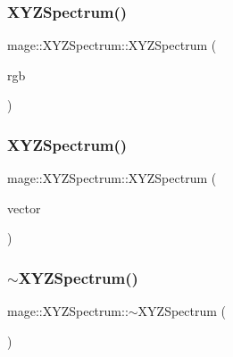 \hypertarget{structmage_1_1_x_y_z_spectrum_a91cf5d611fbad0e47b6718a04b9a505d}{}\label{structmage_1_1_x_y_z_spectrum_a91cf5d611fbad0e47b6718a04b9a505d} 
\subsubsection{\texorpdfstring{X\+Y\+Z\+Spectrum()}{XYZSpectrum()}\hspace{0.1cm}{\footnotesize\ttfamily [4/5]}}
{\footnotesize\ttfamily mage\+::\+X\+Y\+Z\+Spectrum\+::\+X\+Y\+Z\+Spectrum (\begin{DoxyParamCaption}\item[{const \hyperlink{structmage_1_1_r_g_b_spectrum}{R\+G\+B\+Spectrum} \&}]{rgb }\end{DoxyParamCaption})}

\hypertarget{structmage_1_1_x_y_z_spectrum_a4775c0f3d8bff524281c186ee5e91e60}{}\label{structmage_1_1_x_y_z_spectrum_a4775c0f3d8bff524281c186ee5e91e60} 
\subsubsection{\texorpdfstring{X\+Y\+Z\+Spectrum()}{XYZSpectrum()}\hspace{0.1cm}{\footnotesize\ttfamily [5/5]}}
{\footnotesize\ttfamily mage\+::\+X\+Y\+Z\+Spectrum\+::\+X\+Y\+Z\+Spectrum (\begin{DoxyParamCaption}\item[{const X\+M\+F\+L\+O\+A\+T3 \&}]{vector }\end{DoxyParamCaption})\hspace{0.3cm}{\ttfamily [explicit]}}

\hypertarget{structmage_1_1_x_y_z_spectrum_af3a318ebdb1eb1e47cd81707850049a7}{}\label{structmage_1_1_x_y_z_spectrum_af3a318ebdb1eb1e47cd81707850049a7} 
\subsubsection{\texorpdfstring{$\sim$\+X\+Y\+Z\+Spectrum()}{~XYZSpectrum()}}
{\footnotesize\ttfamily mage\+::\+X\+Y\+Z\+Spectrum\+::$\sim$\+X\+Y\+Z\+Spectrum (\begin{DoxyParamCaption}{ }\end{DoxyParamCaption})\hspace{0.3cm}{\ttfamily [default]}}



